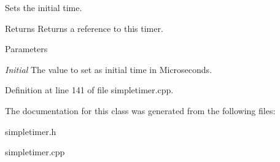 Sets the initial time. 

\begin{DoxyReturn}{Returns}
Returns a reference to this timer. 
\end{DoxyReturn}

\begin{DoxyParams}{Parameters}
\item[{\em Initial}]The value to set as initial time in Microseconds. \end{DoxyParams}


Definition at line 141 of file simpletimer.cpp.



The documentation for this class was generated from the following files:\begin{DoxyCompactItemize}
\item 
simpletimer.h\item 
simpletimer.cpp\end{DoxyCompactItemize}
